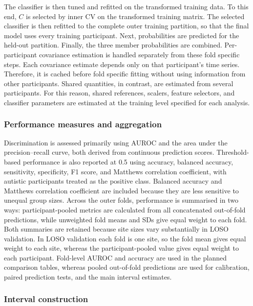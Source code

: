 The classifier is then tuned and refitted on the transformed training data. To this end,
$C$ is selected by inner CV on the transformed training matrix. The selected
classifier is then refitted to the complete outer training partition, so that the final
model uses every training participant. Next, probabilities are predicted for the held-out
partition. Finally, the three member probabilities are combined. Per-participant covariance estimation is handled separately from these fold specific
steps. Each covariance estimate depends only on that participant's time series. Therefore,
it is cached before fold specific fitting without using information from other
participants. Shared quantities, in contrast, are estimated from several participants. For
this reason, shared references, scalers, feature selectors, and classifier parameters are
estimated at the training level specified for each analysis.

\subsubsection{Performance measures and aggregation}
\label{subsubsec:performance-measures}

Discrimination is assessed primarily using AUROC and the area under the precision--recall curve, both derived from continuous prediction scores. Threshold-based performance is also reported at 0.5 using accuracy, balanced accuracy, sensitivity, specificity, F1 score, and Matthews correlation coefficient, with autistic participants treated as the positive class. Balanced accuracy and Matthews correlation coefficient are included because they are less sensitive to unequal group sizes. Across the outer folds, performance is summarised in two ways: participant-pooled metrics are calculated from all concatenated out-of-fold predictions, while unweighted fold means and SDs give equal weight to each fold. Both summaries are retained because site sizes vary substantially in LOSO validation. In LOSO validation each fold is one site, so the fold mean gives equal weight to each site, whereas the participant-pooled value gives equal weight to each participant. Fold-level AUROC and accuracy are used in the planned comparison tables, whereas pooled out-of-fold predictions are used for calibration, paired prediction tests, and the main interval estimates.

\subsubsection{Interval construction}
\label{subsubsec:interval-construction}

